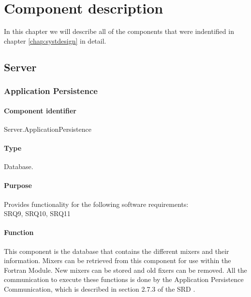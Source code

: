 \chapter{Component description}
\label{chap:compdescr}
In this chapter we will describe all of the components that were indentified in chapter \ref{chap:systdesign} in detail.


\section{Server}
\subsection{Application Persistence}

\subsubsection*{Component identifier}
Server.ApplicationPersistence

\subsubsection*{Type}
Database.

\subsubsection*{Purpose}
Provides functionality for the following software requirements:\\
SRQ9, SRQ10, SRQ11

\subsubsection*{Function}
This component is the database that contains the different mixers and their information. Mixers can be retrieved from this component for use within the Fortran Module. New mixers can be stored and old fixers can be removed. All the communication to execute these functions is done by the Application Persistence Communication, which is described in section 2.7.3 of the SRD \cite{srd}.

